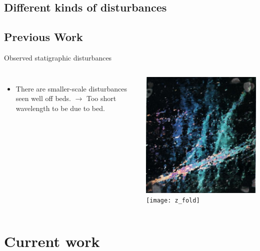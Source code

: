 \documentclass{beamer}
\begin{document}
\subsection{Different kinds of disturbances}

\subsection{Previous Work}

\begin{frame}{Observed statigraphic disturbances}
   \begin{columns}[T]
     \begin{itemize}
       \item There are smaller-scale disturbances seen well off beds.
       \pause $\rightarrow$ Too short wavelength to be due to bed.
     \end{itemize}
     \includegraphics[width=0.5\textheight]{stripes}
     \texttt{[image: z\_fold]}
     \end{columns}

\end{frame}


\section{Current work}
\end{document}
